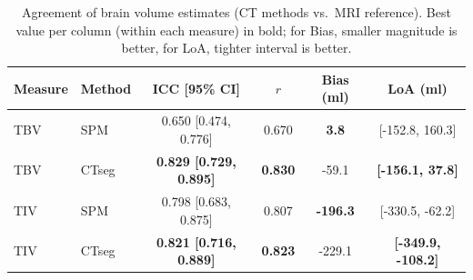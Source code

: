 \begin{table}[t]
\centering
\caption{Agreement of brain volume estimates (CT methods vs.\ MRI reference). Best value per column (within each measure) in bold; for Bias, smaller magnitude is better, for LoA, tighter interval is better.}
\label{tab:volumetrics}
\small
\begin{tabular}{llcccc}
\toprule
Measure & Method & ICC [95\% CI] & $r$ & Bias (ml) & LoA (ml) \\
\midrule
TBV & SPM & 0.650 [0.474, 0.776] & 0.670 & \textbf{3.8} & [-152.8, 160.3] \\
TBV & CTseg & \textbf{0.829 [0.729, 0.895]} & \textbf{0.830} & -59.1 & \textbf{[-156.1, 37.8]} \\
\midrule
TIV & SPM & 0.798 [0.683, 0.875] & 0.807 & \textbf{-196.3} & [-330.5, -62.2] \\
TIV & CTseg & \textbf{0.821 [0.716, 0.889]} & \textbf{0.823} & -229.1 & \textbf{[-349.9, -108.2]} \\
\bottomrule
\end{tabular}
\end{table}
